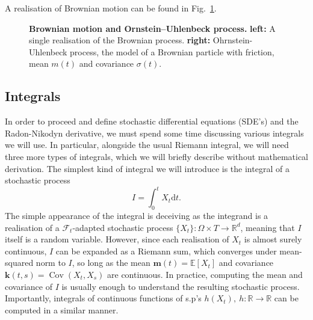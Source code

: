 A realisation of Brownian motion can be found in Fig.~\ref{fig:sp-brown}.
\begin{figure}[h]
	\centering
	\caption[Brownian motion and Ornstein–Uhlenbeck process
	]{\textbf{Brownian motion and Ornstein–Uhlenbeck process.} 
		\textbf{left:} A single realisation of the Brownian process. \textbf{right:} Ohrnstein-Uhlenbeck process, the model of a Brownian particle with friction, mean $m(t)$ and covariance $\sigma(t)$.}
	\label{fig:sp-brown}
\end{figure}

\subsection{Integrals}
In order to proceed and define stochastic differential equations (SDE's) and the Radon-Nikodyn derivative, we must spend some time discussing various integrals we will use. In particular, alongside the usual Riemann integral, we will need three more types of integrals, which we will briefly describe without mathematical derivation. The simplest kind of integral we will introduce is the integral of a stochastic process
\begin{equation}
	I = \int_{0}^{t} X_t \mathrm{d}t.
\end{equation}
The simple appearance of the integral is deceiving as the integrand is a realisation of a $\mathcal{F}_t$-adapted stochastic process $\{X_t\}: \Omega \times T \rightarrow \mathbb{R}^{d}$, meaning that $I$ itself is a random variable. However, since each realisation of $X_t$ is almost surely continuous, $I$ can be expanded as a Riemann sum, which converges under mean-squared norm to $I$, so long as the mean $\mathbf{m}(t) = \mathbb{E}[X_t]$ and covariance $\textbf{k}(t,s) = \operatorname{Cov}(X_t, X_s)$ are continuous. In practice, computing the mean and covariance of $I$ is usually enough to understand the resulting stochastic process. Importantly, integrals of continuous functions of s.p's $h(X_t),~ h: \mathbb{R} \rightarrow \mathbb{R}$ can be computed in a similar manner.

